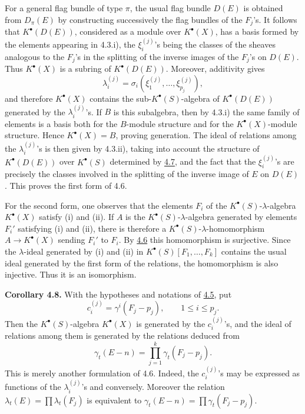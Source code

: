 For a general flag bundle of type \(\pi\), the usual flag bundle \(D(E)\) is obtained from \(D_\pi(E)\) by constructing successively the flag bundles of the \(F_j\)'s. It follows that \(K^\bullet(D(E))\), considered as a module over \(K^\bullet(X)\), has a basis formed by the elements appearing in 4.3.i), the \(\xi_i^{(j)}\)'s being the classes of the sheaves analogous to the \(F_j\)'s in the splitting of the inverse images of the \(F_j\)'s on \(D(E)\). Thus \(K^\bullet(X)\) is a subring of \(K^\bullet(D(E))\). Moreover, additivity gives
\[
  \lambda_i^{(j)}=\sigma_i(\xi_1^{(j)},\ldots,\xi_{p_j}^{(j)}),
\]
and therefore \(K^\bullet(X)\) contains the sub-\(K^\bullet(S)\)-algebra of \(K^\bullet(D(E))\) generated by the \(\lambda_i^{(j)}\)'s. If \(B\) is this subalgebra, then by 4.3.i) the same family of elements is a basis both for the \(B\)-module structure and for the \(K^\bullet(X)\)-module structure. Hence \(K^\bullet(X)=B\), proving generation. The ideal of relations among the \(\lambda_i^{(j)}\)'s is then given by 4.3.ii), taking into account the structure of \(K^\bullet(D(E))\) over \(K^\bullet(S)\) determined by \hyperlink{sga6.e06.cor.4-7}{4.7}, and the fact that the \(\xi_i^{(j)}\)'s are precisely the classes involved in the splitting of the inverse image of \(E\) on \(D(E)\). This proves the first form of 4.6.

For the second form, one observes that the elements \(F_i\) of the \(K^\bullet(S)\)-\(\lambda\)-algebra \(K^\bullet(X)\) satisfy (i) and (ii). If \(A\) is the \(K^\bullet(S)\)-\(\lambda\)-algebra generated by elements \(F_i'\) satisfying (i) and (ii), there is therefore a \(K^\bullet(S)\)-\(\lambda\)-homomorphism \(A\to K^\bullet(X)\) sending \(F_i'\) to \(F_i\). By \hyperlink{sga6.e06.thm.4-6}{4.6} this homomorphism is surjective. Since the \(\lambda\)-ideal generated by (i) and (ii) in \(K^\bullet(S)[F_1,\ldots,F_k]\) contains the usual ideal generated by the first form of the relations, the homomorphism is also injective. Thus it is an isomorphism.

\textbf{Corollary 4.8.} With the hypotheses and notations of \hyperlink{sga6.e06.sec.4.5}{4.5}, put
\[
  c_i^{(j)}=\gamma^i(F_j-p_j),
  \qquad 1\leq i\leq p_j.
\]
Then the \(K^\bullet(S)\)-algebra \(K^\bullet(X)\) is generated by the \(c_i^{(j)}\)'s, and the ideal of relations among them is generated by the relations deduced from
\[
  \gamma_t(E-n)=\prod_{j=1}^{k}\gamma_t(F_j-p_j).
\]
This is merely another formulation of 4.6. Indeed, the \(c_i^{(j)}\)'s may be expressed as functions of the \(\lambda_i^{(j)}\)'s and conversely. Moreover the relation \(\lambda_t(E)=\prod\lambda_t(F_j)\) is equivalent to \(\gamma_t(E-n)=\prod\gamma_t(F_j-p_j)\).

